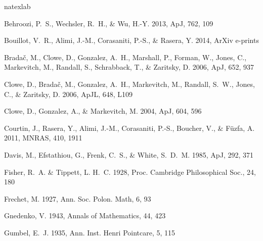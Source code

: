 \documentclass[useAMS, usenatbib]{mn2e}
\newcommand{\apj}{ApJ}
\newcommand{\apjl}{ApJL}
\newcommand{\mnras}{MNRAS}
\begin{document}
\vspace{-0.25cm}
\footnotesize{
\begin{thebibliography}{30}
\expandafter\ifx\csname natexlab\endcsname\relax\def\natexlab#1{#1}\fi

{Behroozi}, P.~S., {Wechsler}, R.~H., \& {Wu}, H.-Y. 2013, \apj, 762, 109

{Bouillot}, V.~R., {Alimi}, J.-M., {Corasaniti}, P.-S., \& {Rasera}, Y. 2014,
  ArXiv e-prints

{Brada{\v c}}, M., {Clowe}, D., {Gonzalez}, A.~H., {Marshall}, P., {Forman},
  W., {Jones}, C., {Markevitch}, M., {Randall}, S., {Schrabback}, T., \&
  {Zaritsky}, D. 2006, \apj, 652, 937

{Clowe}, D., {Brada{\v c}}, M., {Gonzalez}, A.~H., {Markevitch}, M., {Randall},
  S.~W., {Jones}, C., \& {Zaritsky}, D. 2006, \apjl, 648, L109

{Clowe}, D., {Gonzalez}, A., \& {Markevitch}, M. 2004, \apj, 604, 596

{Courtin}, J., {Rasera}, Y., {Alimi}, J.-M., {Corasaniti}, P.-S., {Boucher},
  V., \& {F{\"u}zfa}, A. 2011, \mnras, 410, 1911

{Davis}, M., {Efstathiou}, G., {Frenk}, C.~S., \& {White}, S.~D.~M. 1985, \apj,
  292, 371

{Fisher}, R.~A. \& Tippett, L. H.~C. 1928, Proc. Cambridge Philosophical Soc.,
  24, 180

{Frechet}, M. 1927, Ann. Soc. Polon. Math, 6, 93

{Gnedenko}, V. 1943, Annals of Mathematics, 44, 423

{Gumbel}, E.~J. 1935, Ann. Inst. Henri Pointcare, 5, 115


\end{thebibliography}}
\end{document}
